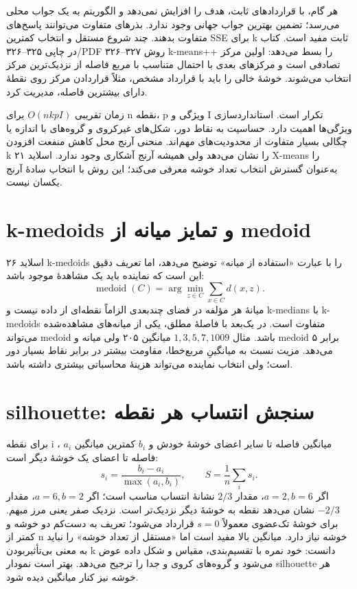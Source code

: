 هر گام، با قراردادهای ثابت، هدف را افزایش نمی‌دهد و الگوریتم به یک جواب محلی می‌رسد؛ تضمین بهترین جواب جهانی وجود ندارد. بذرهای متفاوت می‌توانند پاسخ‌های متفاوت بدهند. چند شروع مستقل و انتخاب کمترین SSE برای k ثابت مفید است. کتاب در چاپی ۳۲۵--۳۲۶/PDF ۳۲۶--۳۲۷ روش k-means++ را بسط می‌دهد: اولین مرکز تصادفی است و مرکزهای بعدی با احتمال متناسب با مربع فاصله از نزدیک‌ترین مرکز انتخاب می‌شوند. خوشهٔ خالی را باید با قرارداد مشخص، مثلاً قراردادن مرکز روی نقطهٔ دارای بیشترین فاصله، مدیریت کرد.

زمان تقریبی \(O(nkpI)\) برای n نقطه، p ویژگی و I تکرار است. استانداردسازی ویژگی‌ها اهمیت دارد. حساسیت به نقاط دور، شکل‌های غیرکروی و گروه‌های با اندازه یا چگالی بسیار متفاوت از محدودیت‌های مهم‌اند. منحنی آرنج محل کاهش منفعت افزودن k را نشان می‌دهد ولی همیشه آرنج آشکاری وجود ندارد. اسلاید ۲۱ X-means را به‌عنوان گسترش انتخاب تعداد خوشه معرفی می‌کند؛ این روش با انتخاب سادهٔ آرنج یکسان نیست.

\section{k-medoids و تمایز میانه از medoid}

اسلاید ۲۶ k-medoids را با عبارت «استفاده از میانه» توضیح می‌دهد، اما تعریف دقیق این است که نماینده باید یک مشاهدهٔ موجود باشد: \[
\operatorname{medoid}(C)=\arg\min_{z\in C}\sum_{x\in C}d(x,z).
\] میانهٔ هر مؤلفه در فضای چندبعدی الزاماً نقطه‌ای از داده نیست و k-medians با k-medoids متفاوت است. در یک‌بعد با فاصلهٔ مطلق، یکی از میانه‌های مشاهده‌شده می‌تواند medoid باشد. مثال \(1,3,5,7,1009\) میانگین ۲۰۵ ولی میانه و medoid برابر ۵ می‌دهد. مزیت نسبت به میانگینِ مربع‌خطا، مقاومت بیشتر در برابر نقاط بسیار دور است؛ ولی انتخاب نماینده می‌تواند هزینهٔ محاسباتی بیشتری داشته باشد.

\section{silhouette: سنجش انتساب هر نقطه}

برای نقطه i ، \(a_i\) میانگین فاصله تا سایر اعضای خوشهٔ خودش و \(b_i\) کمترین میانگین فاصله تا اعضای یک خوشهٔ دیگر است: \[
s_i=\frac{b_i-a_i}{\max(a_i,b_i)},\qquad S=\frac1n\sum_i s_i.
\] اگر \(a=2,b=6\)، مقدار \(2/3\) نشانهٔ انتساب مناسب است؛ اگر \(a=6,b=2\)، مقدار \(-2/3\) نشان می‌دهد نقطه به خوشهٔ دیگر نزدیک‌تر است. نزدیک صفر یعنی مرز مبهم. برای خوشهٔ تک‌عضوی معمولاً $s=0$ قرارداد می‌شود؛ تعریف به دست‌کم دو خوشه و کمتر از n خوشه نیاز دارد. میانگین بالا مفید است اما «مستقل از تعداد خوشه» را نباید به معنی بی‌تأثیربودن k دانست: خود نمره با تقسیم‌بندی، مقیاس و شکل داده عوض می‌شود و گروه‌های کروی و جدا را ترجیح می‌دهد. بهتر است نمودار silhouette هر خوشه نیز کنار میانگین دیده شود.

